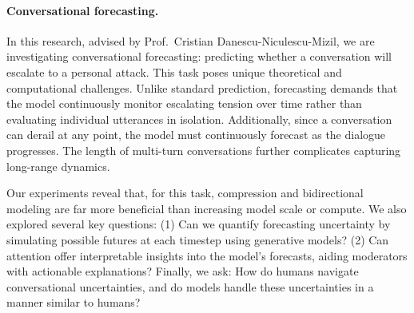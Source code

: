 
\paragraph{Conversational forecasting.}

In this research, advised by Prof.~Cristian Danescu-Niculescu-Mizil, we are investigating conversational forecasting: predicting whether a conversation will escalate to a personal attack.
%
This task poses unique theoretical and computational challenges.
%
Unlike standard prediction, forecasting demands that the model continuously monitor escalating tension over time rather than evaluating individual utterances in isolation.
%
Additionally, since a conversation can derail at any point, the model must continuously forecast as the dialogue progresses.
%
The length of multi-turn conversations further complicates capturing long-range dynamics.

Our experiments reveal that, for this task, compression and bidirectional modeling are far more beneficial than increasing model scale or compute. We also explored several key questions:
%
(1) Can we quantify forecasting uncertainty by simulating possible futures at each timestep using generative models?
%
(2) Can attention offer interpretable insights into the model's forecasts, aiding moderators with actionable explanations?
%
Finally, we ask: How do humans navigate conversational uncertainties, and do models handle these uncertainties in a manner similar to humans?

